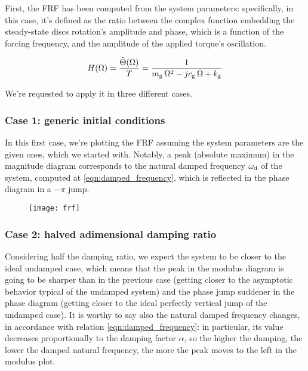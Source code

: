 \documentclass[a4paper,12pt,oneside]{article}
\begin{document}
First, the FRF has been computed from the system parameters: specifically, in this case, it's defined as the ratio between the complex function embedding the steady-state discs rotation's amplitude and phase, which is a function of the forcing frequency, and the amplitude of the applied torque's oscillation.

\clearpage

\[
	H(\Omega) = \frac{\tilde{\Theta}(\Omega)}{T} =
		\frac{1}{m_\textup{g} \, \Omega^2 - j c_\textup{g} \, \Omega + k_\textup{g}}
\]

We're requested to apply it in three different cases.

\subsubsection*{Case 1: generic initial conditions}

In this first case, we're plotting the FRF assuming the system parameters are the given ones, which we started with. Notably, a peak (absolute maximum) in the magnitude diagram corresponds to the natural damped frequency $ \omega_\textup{d} $ of the system, computed at \eqref{eqn:damped_frequency}, which is reflected in the phase diagram in a $ -\pi $ jump.

\begin{figure}[h]
	\hspace{-70pt}
	\texttt{[image: frf]}
\end{figure}

\subsubsection*{Case 2: halved adimensional damping ratio}

Considering half the damping ratio, we expect the system to be closer to the ideal undamped case, which means that the peak in the modulus diagram is going to be sharper than in the previous case (getting closer to the asymptotic behavior typical of the undamped system) and the phase jump suddener in the phase diagram (getting closer to the ideal perfectly vertical jump of the undamped case). It is worthy to say also the natural damped frequency changes, in accordance with relation \eqref{eqn:damped_frequency}: in particular, its value decreases proportionally to the damping factor $ \alpha $, so the higher the damping, the lower the damped natural frequency, the more the peak moves to the left in the modulus plot.

\clearpage
\end{document}
